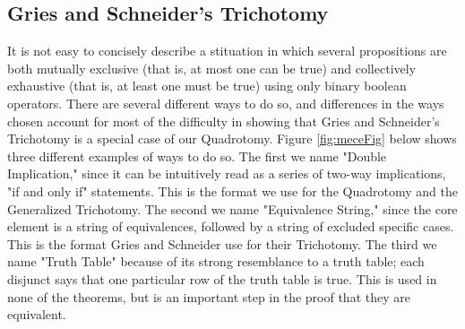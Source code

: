 \documentclass[12pt, fleqn, leqno]{article}
\begin{document}
\subsection{Gries and Schneider's Trichotomy}

It is not easy to concisely describe a stituation in which several propositions are both mutually exclusive (that is, at most one can be true) and collectively exhaustive (that is, at least one must be true) using only binary boolean operators.
There are several different ways to do so, and differences in the ways chosen account for most of the difficulty in showing that Gries and Schneider's Trichotomy is a special case of our Quadrotomy.
Figure \ref{fig:meceFig} below shows three different examples of ways to do so.
The first we name "Double Implication," since it can be intuitively read as a series of two-way implications, "if and only if" statements.
This is the format we use for the Quadrotomy and the Generalized Trichotomy.
The second we name "Equivalence String," since the core element is a string of equivalences, followed by a string of excluded specific cases.
This is the format Gries and Schneider use for their Trichotomy.
The third we name "Truth Table" because of its strong resemblance to a truth table; each disjunct says that one particular row of the truth table is true.
This is used in none of the theorems, but is an important step in the proof that they are equivalent.
\end{document}
